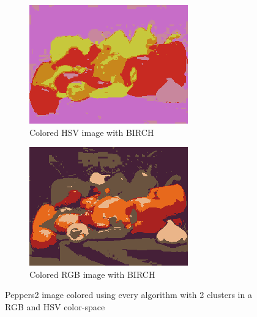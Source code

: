 \documentclass[sigconf,authorversion]{acmart}
\begin{document}
\begin{figure}[hbtp]
  \begin{subfigure}[b]{0.45\columnwidth}
      \includegraphics[width=\columnwidth]{../outputs/peppers2_5_hsv_colored_birch.png}
      \caption{Colored HSV image with BIRCH}
      \label{subfig:peppers_hsv_birch}
  \end{subfigure}
  \hspace{0.05\columnwidth}
  \begin{subfigure}[b]{0.45\columnwidth}
      \includegraphics[width=\columnwidth]{../outputs/peppers2_5_rgb_colored_birch.png}
      \caption{Colored RGB image with BIRCH}
      \label{subfig:peppers_rgb_birch}
  \end{subfigure}
  \caption{Peppers2 image colored  using every algorithm with 2 clusters in a RGB and HSV color-space}
  \label{fig:peppers_5}
\end{figure}
\end{document}
